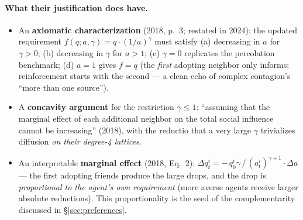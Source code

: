 \documentclass[11pt,a4paper]{article}
\begin{document}
\paragraph{What their justification does have.}
\begin{itemize}
  \item An \textbf{axiomatic characterization} (2018, p.~3; restated in 2024): the
    updated requirement $f(q; a, \gamma) = q \cdot (1/a)^{\gamma}$ must satisfy
    (a) decreasing in $a$ for $\gamma > 0$; (b) decreasing in $\gamma$ for $a > 1$;
    (c) $\gamma = 0$ replicates the percolation benchmark; (d) $a = 1$ gives $f = q$
    (the \emph{first} adopting neighbor only informs; reinforcement starts with the
    second --- a clean echo of complex contagion's ``more than one source'').
  \item A \textbf{concavity argument} for the restriction $\gamma \le 1$: ``assuming
    that the marginal effect of each additional neighbor on the total social influence
    cannot be increasing'' (2018), with the reductio that a very large $\gamma$
    trivializes diffusion \emph{on their degree-4 lattices}.
  \item An interpretable \textbf{marginal effect} (2018, Eq.~2):
    $\Delta q_t^i = -\, q_0^i \gamma \,/\, (a_t^i)^{\gamma+1} \cdot \Delta a$ --- the
    first adopting friends produce the large drops, and the drop is \emph{proportional
    to the agent's own requirement} (more averse agents receive larger absolute
    reductions). This proportionality is the seed of the complementarity discussed in
    \S\ref{sec:preferences}.
\end{itemize}
\end{document}
